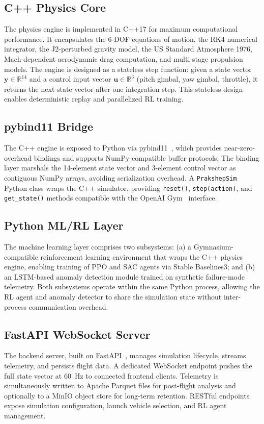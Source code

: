 \documentclass[conference]{IEEEtran}
\newcommand{\vect}[1]{\boldsymbol{#1}}
\begin{document}
\subsection{C++ Physics Core}
The physics engine is implemented in C++17 for maximum computational performance. It encapsulates the 6-DOF equations of motion, the RK4 numerical integrator, the J2-perturbed gravity model, the US Standard Atmosphere 1976, Mach-dependent aerodynamic drag computation, and multi-stage propulsion models. The engine is designed as a stateless step function: given a state vector $\vect{y} \in \mathbb{R}^{14}$ and a control input vector $\vect{u} \in \mathbb{R}^{3}$ (pitch gimbal, yaw gimbal, throttle), it returns the next state vector after one integration step. This stateless design enables deterministic replay and parallelized RL training.

\subsection{pybind11 Bridge}
The C++ engine is exposed to Python via pybind11~\cite{jakob2017pybind11}, which provides near-zero-overhead bindings and supports NumPy-compatible buffer protocols. The binding layer marshals the 14-element state vector and 3-element control vector as contiguous NumPy arrays, avoiding serialization overhead. A \texttt{PrakshepSim} Python class wraps the C++ simulator, providing \texttt{reset()}, \texttt{step(action)}, and \texttt{get\_state()} methods compatible with the OpenAI Gym~\cite{brockman2016openai} interface.

\subsection{Python ML/RL Layer}
The machine learning layer comprises two subsystems: (a) a Gymnasium-compatible reinforcement learning environment that wraps the C++ physics engine, enabling training of PPO and SAC agents via Stable Baselines3; and (b) an LSTM-based anomaly detection module trained on synthetic failure-mode telemetry. Both subsystems operate within the same Python process, allowing the RL agent and anomaly detector to share the simulation state without inter-process communication overhead.

\subsection{FastAPI WebSocket Server}
The backend server, built on FastAPI~\cite{ramirez2018fastapi}, manages simulation lifecycle, streams telemetry, and persists flight data. A dedicated WebSocket endpoint pushes the full state vector at 60~Hz to connected frontend clients. Telemetry is simultaneously written to Apache Parquet files for post-flight analysis and optionally to a MinIO object store for long-term retention. RESTful endpoints expose simulation configuration, launch vehicle selection, and RL agent management.
\end{document}
